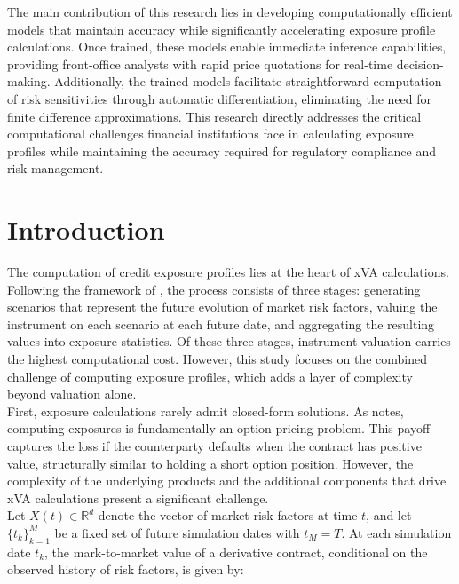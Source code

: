     \noindent 
    The main contribution of this research lies in developing computationally efficient models that maintain accuracy while significantly accelerating exposure profile calculations. Once trained, these models enable immediate inference capabilities, providing front-office analysts with rapid price quotations for real-time decision-making. Additionally, the trained models facilitate straightforward computation of risk sensitivities through automatic differentiation, eliminating the need for finite difference approximations. This research directly addresses the critical computational challenges financial institutions face in calculating exposure profiles while maintaining the accuracy required for regulatory compliance and risk management. 
\section{Introduction}\label{sec:method_introduction} 
    The computation of credit exposure profiles lies at the heart of xVA calculations. Following the framework of \cite{zhu2007guide}, the process consists of three stages: generating scenarios that represent the future evolution of market risk factors, valuing the instrument on each scenario at each future date, and aggregating the resulting values into exposure statistics. Of these three stages, instrument valuation carries the highest computational cost. However, this study focuses on the combined challenge of computing exposure profiles, which adds a layer of complexity beyond valuation alone. \\
    
    \noindent
    First, exposure calculations rarely admit closed-form solutions. As \cite{Gregory_2015} notes, computing exposures is fundamentally an option pricing problem. This payoff captures the loss if the counterparty defaults when the contract has positive value, structurally similar to holding a short option position. However, the complexity of the underlying products and the additional components that drive xVA calculations present a significant challenge.\\

    \noindent
    Let $X(t) \in \mathbb{R}^d$ denote the vector of market risk factors at time $t$, and let $\{t_k\}_{k=1}^{M}$ be a fixed set of future simulation dates with $t_M = T$. At each simulation date $t_k$, the mark-to-market value of a derivative contract, conditional on the observed history of risk factors, is given by:
    
